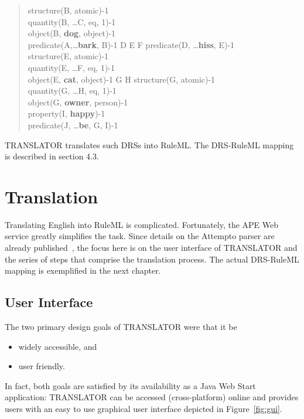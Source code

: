 \documentclass[12pt]{report}
\begin{document}
\begin{quote}
\drs{~}
{
 \downifdrs{~}
 {
  {
   structure(B, atomic)-1\\
   quantity(B, \ldots C, eq, 1)-1\\
   object(B, \textbf{dog}, object)-1\\
   predicate(A,\ldots \textbf{bark}, B)-1
  }
  {D E F}
  {
   predicate(D, \ldots \textbf{hiss}, E)-1\\
   structure(E, atomic)-1\\
   quantity(E, \ldots F, eq, 1)-1\\
   object(E, \textbf{cat}, object)-1
  }
 }
 {G H}
 {
  structure(G, atomic)-1\\
  quantity(G, \ldots H, eq, 1)-1\\
  object(G, \textbf{owner}, person)-1\\
  {
   property(I, \textbf{happy})-1\\
   predicate(J, \ldots \textbf{be}, G, I)-1
  }
 }
}
\end{quote}

TRANSLATOR translates such DRSs into RuleML. The DRS-RuleML mapping is described in section 4.3.

\chapter{Translation}
Translating English into RuleML is complicated. Fortunately, the APE Web service greatly simplifies the task. Since details on the Attempto parser are already published~\cite{ape}, the focus here is on the user interface of TRANSLATOR and the series of steps that comprise the translation process. The actual DRS-RuleML mapping is exemplified in the next chapter.

\section{User Interface}

The two primary design goals of TRANSLATOR were that it be
\begin{itemize}
	\item widely accessible, and
	\item user friendly.
\end{itemize}
In fact, both goals are satisfied by its availability as a Java Web Start application: TRANSLATOR can be accessed (cross-platform) online and provides users with an easy to use graphical user interface depicted in Figure~\ref*{fig:gui}.
\end{document}
